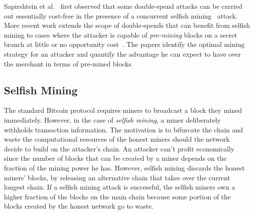 Sapirshtein et al.~\cite{sapirshtein:2015} first observed that some double-spend attacks can be carried out essentially cost-free in the presence of a concurrent selfish mining~\cite{eyal:2014} attack. 
More recent work extends the scope of double-spends that can benefit from selfish mining to cases where the attacker is capable of \emph{pre-mining} blocks on a secret branch at little or no opportunity cost~\cite{Sompolinsky:2016}. The papers identify the optimal mining strategy for an attacker and quantify the advantage he can expect to have over the merchant in terms of pre-mined blocks.


\subsection{Selfish Mining}

The standard Bitcoin protocol requires miners to broadcast a block they mined immediately. However, in the case of {\em selfish mining}, a miner deliberately withholds transaction information. The motivation is to bifurcate the chain and waste the computational resources of the honest miners should the network decide to build on the attacker's chain. An attacker can't profit economically since the number of blocks that can be created by a miner depends on the fraction of the mining power he has. However, selfish mining discards the honest miners' blocks, by releasing an alternative chain that takes over the current longest chain. If a selfish mining attack is successful, the selfish miners own a higher fraction of the blocks on the main chain because some portion of the blocks created by the honest network go to waste.

